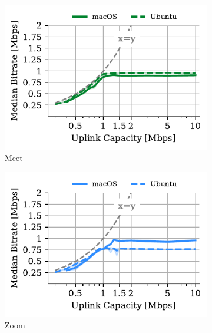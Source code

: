 \begin{figure}[]
\begin{subfigure}[t]{0.4\textwidth}
    \centering
    \includegraphics[width=\textwidth,keepaspectratio]{figures/static_mac/uplink_Meet_comparison.pdf}
    \caption{Meet}
	\label{subfig:uplink_meet_bitrate_mac}
\end{subfigure}\hfill
\begin{subfigure}[t]{0.4\textwidth}
    \centering
    \includegraphics[width=\textwidth,keepaspectratio]{figures/static_mac/uplink_Zoom_comparison.pdf}
    \caption{Zoom}
	\label{subfig:uplink_zoom_bitrate_mac}
\end{subfigure}\hfill
\begin{subfigure}[t]{0.4\textwidth}
    \centering

\end{subfigure}
\end{figure}
